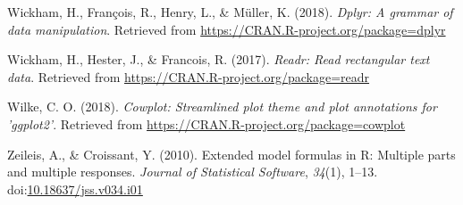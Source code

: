 \documentclass[man, fleqn, noextraspace]{apa6}
\theoremstyle{definition}
\theoremstyle{definition}
\theoremstyle{definition}
\theoremstyle{remark}
\begin{document}
\hypertarget{ref-R-dplyr}{}
Wickham, H., François, R., Henry, L., \& Müller, K. (2018). \emph{Dplyr:
A grammar of data manipulation}. Retrieved from
\url{https://CRAN.R-project.org/package=dplyr}

\hypertarget{ref-R-readr}{}
Wickham, H., Hester, J., \& Francois, R. (2017). \emph{Readr: Read
rectangular text data}. Retrieved from
\url{https://CRAN.R-project.org/package=readr}

\hypertarget{ref-R-cowplot}{}
Wilke, C. O. (2018). \emph{Cowplot: Streamlined plot theme and plot
annotations for 'ggplot2'}. Retrieved from
\url{https://CRAN.R-project.org/package=cowplot}

\hypertarget{ref-R-Formula}{}
Zeileis, A., \& Croissant, Y. (2010). Extended model formulas in R:
Multiple parts and multiple responses. \emph{Journal of Statistical
Software}, \emph{34}(1), 1--13.
doi:\href{https://doi.org/10.18637/jss.v034.i01}{10.18637/jss.v034.i01}

\endgroup
\end{document}
